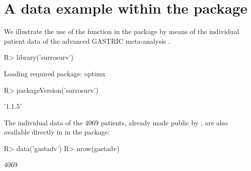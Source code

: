 \documentclass[article,shortnames, nojss]{jss}\usepackage[]{graphicx}\usepackage[]{color}
\begin{document}
\section[A data example within the surrosurv package]{A data example within the  package}
We illustrate the use of the function in the  package
by means of the individual patient data of the advanced GASTRIC meta-analysis
\citep{GASTRIC13, Paoletti2013}.
\begin{Schunk}
\begin{Sinput}
R> library('surrosurv')
\end{Sinput}
\begin{Soutput}
Loading required package: optimx
\end{Soutput}
\begin{Sinput}
R> packageVersion('surrosurv')
\end{Sinput}
\begin{Soutput}
[1] '1.1.5'
\end{Soutput}
\end{Schunk}

The individual data of the 4069 patients,
already made public by \cite{BuyseEtal15},
are also available directly in  in the  package:
\begin{Schunk}
\begin{Sinput}
R> data('gastadv')
R> nrow(gastadv)
\end{Sinput}
\begin{Soutput}
[1] 4069
\end{Soutput}
\end{Schunk}
\end{document}
